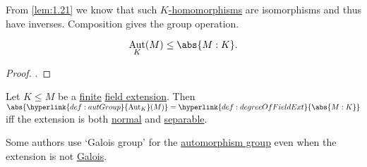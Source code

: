 \documentclass{article}
\DeclareMathOperator{\Aut}{Aut}
\DeclareMathOperator{\Gal}{Gal}
\begin{document}

From \cref{lem:1.21} we know that such \hyperlink{def:homo}{$K$-homomorphisms} are isomorphisms and thus have inverses. Composition gives the group operation.

\begin{nlemma}\label{lem:2.23}
    \begin{equation*}
        \Aut_K(M) \leq \abs{M:K}.
    \end{equation*}
\end{nlemma}

\begin{proof}
    .
\end{proof}

\begin{nthm}\label{thm:2.24}
    Let $K \leq M$ be a \hyperlink{def:degreeOfFieldExt}{finite} \hyperlink{def:fieldExt}{field extension}.
    Then $\abs{\hyperlink{def:autGroup}{\Aut_K}(M)} = \hyperlink{def:degreeOfFieldExt}{\abs{M:K}}$ iff the extension is both \hyperlink{def:normal}{normal} and \hyperlink{def:separableExt}{separable}.
\end{nthm}




\begin{remark}
    Some authors use `Galois group' for the \hyperlink{def:autGroup}{automorphism group} even when the extension is not \hyperlink{def:galoisExt}{Galois}.
\end{remark}
\end{document}
